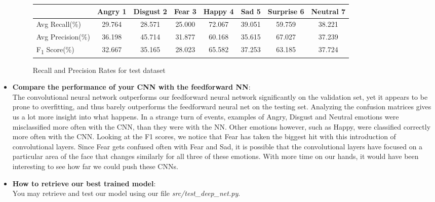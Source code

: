 \begin{itemize}
  
\begin{figure}[h]
\begin{center}
\caption{Recall and Precision Rates for test dataset}
\begin{tabular}{ | l || c | c | c | c | c | c | c |}
  \hline
         & Angry 1 & Disgust 2 & Fear 3 & Happy 4 & Sad 5 & Surprise 6 & Neutral 7 \\ \hline \hline
        Avg Recall(\%) & 29.764 &28.571 &25.000 &72.067 &39.051 &59.759 &38.221 \\ \hline
        Avg Precision(\%) & 36.198 &45.714 &31.877 &60.168 &35.615 &67.027 &37.239 \\ \hline
        F\textsubscript{1} Score(\%) & 32.667 &35.165 &28.023 &65.582 &37.253 &63.185 &37.724 \\ \hline
    \end{tabular}
    \label{fig:averageRecall}
\end{center}
\end{figure}


\item \textbf{Compare the performance of your CNN with the feedforward NN}:\\
  The convolutional neural network outperforms our feedforward neural network significantly on the validation set,
  yet it appears to be prone to overfitting, and thus barely outperforms the feedforward neural net on the testing set.
  Analyzing the confusion matrices gives us a lot more insight into what happens.
  In a strange turn of events, examples of Angry, Disgust and Neutral emotions were misclassified more often with the CNN,
  than they were with the NN.
  Other emotions however, such as Happy, were classified correctly more often with the CNN.
  Looking at the F1 scores, we notice that Fear has taken the biggest hit with this introduction of convolutional layers.
  Since Fear gets confused often with Fear and Sad, it is possible that the convolutional layers have focused on
  a particular area of the face that changes similarly for all three of these emotions.
  With more time on our hands, it would have been interesting to see how far we could push these CNNs.

\item \textbf{How to retrieve our best trained model}:\\
  You may retrieve and test our model using our file \emph{src/test\_deep\_net.py}.
  
\end{itemize}
